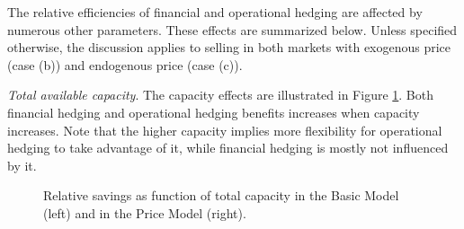 \documentclass[mnsc,nonblindrev,copyedit]{informs2_wz} %
\begin{document}
The relative efficiencies of financial and operational hedging are affected by numerous other parameters.  These effects are summarized below.  Unless specified otherwise, the discussion applies to selling in both markets with exogenous price (case (b)) and endogenous price (case (c)).


{\noindent \em Total available capacity}.  The capacity effects are illustrated in Figure \ref{fig:capacity}.  Both financial hedging and operational hedging benefits increases when capacity increases.  Note that the higher capacity implies more flexibility for operational hedging to take advantage of it, while financial hedging is mostly not influenced by it.

\begin{figure}[ht]
\begin{center}
\begin{minipage}{6in}
    \begin{minipage}{3.1in}
        \epsfxsize=2.8in
   \hspace{-0.0in}     
    \end{minipage}
    \begin{minipage}{2.8in}
        \epsfxsize=2.8in
    \hspace{-0.0in}    
    \end{minipage}
\end{minipage}
\vspace{.05in} \caption{Relative savings as function of total capacity in the Basic Model (left) and in the Price Model (right).} \label{fig:capacity} \vspace{-.2in}
\end{center}
\end{figure}
\end{document}

